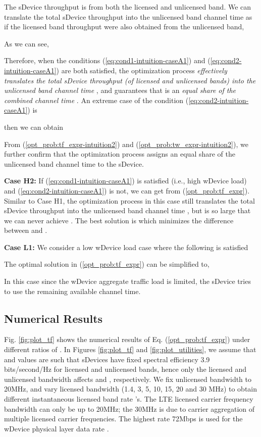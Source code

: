 \documentclass[journal,final,letterpaper,10pt,doublecolumn,twoside]{IEEEtran}
\begin{document}
The sDevice throughput is from both the licensed and unlicensed band. We can translate the total sDevice throughput into the unlicensed band channel time  as if the licensed band throughput were also obtained from the unlicensed band,

As we can see,

Therefore, when the conditions (\ref{eq:cond1-intuition-caseA1}) and (\ref{eq:cond2-intuition-caseA1}) are both satisfied, the optimization process \emph{effectively translates the total sDevice throughput (of licensed and unlicensed bands) into the unlicensed band channel time} , and guarantees  that  is an \emph{equal share of the combined channel time} .
An extreme case of the condition (\ref{eq:cond2-intuition-caseA1})  is

then we can obtain

From  (\ref{opt_prob:tf_expr-intuition2}) and (\ref{opt_prob:tw_expr-intuition2}), we further confirm that the optimization process assigns an equal share of the unlicensed band channel time to the sDevice.

\textbf{Case H2:} If  (\ref{eq:cond1-intuition-caseA1}) is satisfied (i.e., high wDevice load) and (\ref{eq:cond2-intuition-caseA1}) is not, we can get   from (\ref{opt_prob:tf_expr}). Similar to Case H1, the optimization process in this case still translates the total sDevice throughput into the unlicensed band channel time , but  is so large that we can never achieve  . The best solution is  which minimizes the difference between  and .

\textbf{Case L1:} We consider a low wDevice load case where  the following is satisfied

The optimal solution  in (\ref{opt_prob:tf_expr}) can be simplified to,

In this case since the wDevice aggregate traffic load is limited, the sDevice tries to use the remaining available channel time.


\subsection{Numerical Results} \label{subsec:numerical-results}

Fig. \ref{fig:plot_tf} shows the numerical results of Eq. (\ref{opt_prob:tf_expr}) under different ratios of .
In Figures \ref{fig:plot_tf} and \ref{fig:plot_utilities}, we assume that  and  values are such that sDevices have fixed spectral efficiency 3.9 bits/second/Hz for licensed and unlicensed bands, hence only the licensed and unlicensed bandwidth affects  and , respectively. We fix unlicensed  bandwidth to 20MHz, and vary licensed bandwidth (1.4, 3, 5, 10, 15, 20 and 30 MHz) to obtain different instantaneous licensed band rate 's. The LTE licensed carrier frequency bandwidth can only be up to 20MHz; the 30MHz is due to carrier aggregation of multiple licensed carrier frequencies. The highest rate 72Mbps is used for the wDevice physical layer data rate .
\end{document}
